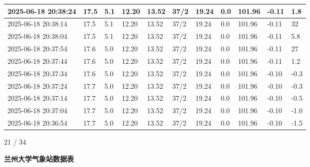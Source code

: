 \documentclass[UTF8,10pt,a4paper,fontset=fandol]{ctexart}
\begin{document}
\begin{center}
{\begin{tabular}{|p{3.05cm}|*{10}{p{0.68cm}|}}
2025-06-18 20:38:24 & 17.5 & 5.1 & 12.20 & 13.52 & 37/2 & 19.24 & 0.0 & 101.96 & -0.11 & 1.8
\\ \hline
2025-06-18 20:38:14 & 17.5 & 5.1 & 12.20 & 13.52 & 37/2 & 19.24 & 0.0 & 101.96 & -0.11 & 32
\\ \hline
2025-06-18 20:38:04 & 17.5 & 5.1 & 12.20 & 13.52 & 37/2 & 19.24 & 0.0 & 101.96 & -0.11 & 5.8
\\ \hline
2025-06-18 20:37:54 & 17.6 & 5.0 & 12.20 & 13.52 & 37/2 & 19.24 & 0.0 & 101.96 & -0.11 & 27
\\ \hline
2025-06-18 20:37:44 & 17.6 & 5.0 & 12.20 & 13.52 & 37/2 & 19.24 & 0.0 & 101.96 & -0.11 & 1.2
\\ \hline
2025-06-18 20:37:34 & 17.6 & 5.0 & 12.20 & 13.52 & 37/2 & 19.24 & 0.0 & 101.96 & -0.10 & -0.3
\\ \hline
2025-06-18 20:37:24 & 17.7 & 5.0 & 12.20 & 13.52 & 37/2 & 19.24 & 0.0 & 101.96 & -0.10 & -0.3
\\ \hline
2025-06-18 20:37:14 & 17.7 & 5.0 & 12.20 & 13.52 & 37/2 & 19.24 & 0.0 & 101.96 & -0.10 & -0.5
\\ \hline
2025-06-18 20:37:04 & 17.7 & 5.0 & 12.20 & 13.52 & 37/2 & 19.24 & 0.0 & 101.96 & -0.10 & -1.0
\\ \hline
2025-06-18 20:36:54 & 17.7 & 5.0 & 12.20 & 13.52 & 37/2 & 19.24 & 0.0 & 101.96 & -0.10 & -1.5
\\ \hline
\end{tabular}%
}
\end{center}

\begin{flushright}
21 / 34
\end{flushright}

\newpage

\begin{center}
\textbf{兰州大学气象站数据表}
\end{center}
\end{document}
